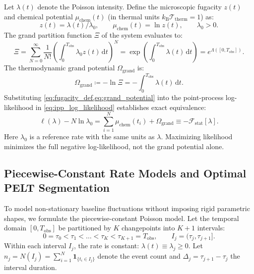 \begin{proposition}
  \label{prop:grand_canonical}
  Let $\lambda(t)$ denote the Poisson intensity. Define the
  microscopic fugacity $z(t)$ and chemical potential
  $\mu_{\mathrm{chem}}(t)$ (in thermal units
  $k_{\mathrm{B}}\mathcal{T}_{\mathrm{therm}} = 1$) as:
  \begin{equation}
    z(t)=\lambda(t)/\lambda_0,\qquad
    \mu_{\mathrm{chem}}(t)=\ln z(t),\qquad\lambda_0>0.
    \label{eq:fugacity_def}
  \end{equation}
  The grand partition function $\Xi$ of the system evaluates to:
  \begin{equation}
    \Xi = \sum_{N=0}^\infty \frac{1}{N!} \left(
    \int_0^{T_{\mathrm{obs}}} \lambda_0z(t) \, \mathrm{d}t \right)^N =
    \exp\left( \int_0^{T_{\mathrm{obs}}} \lambda(t) \, \mathrm{d}t
    \right) = e^{\Lambda([0, T_{\mathrm{obs}}])}.
    \label{eq:grand_partition_function}
  \end{equation}
  The thermodynamic grand potential $\Omega_{\mathrm{grand}}$ is:
  \begin{equation}
    \Omega_{\mathrm{grand}} \coloneqq -\ln \Xi =
    -\int_0^{T_{\mathrm{obs}}} \lambda(t) \, \mathrm{d}t.
    \label{eq:grand_potential}
  \end{equation}
  Substituting \cref{eq:fugacity_def,eq:grand_potential} into the point-process
  log-likelihood in \cref{eq:ipp_log_likelihood} establishes exact equivalence:
  \begin{equation}
    \ell(\lambda)-N\ln\lambda_0 = \sum_{i=1}^N \mu_{\mathrm{chem}}(t_i) +
    \Omega_{\mathrm{grand}} \equiv -\mathcal{F}_{\mathrm{stat}}[\lambda].
    \label{eq:stat_mech_likelihood_equiv}
  \end{equation}
  Here $\lambda_0$ is a reference rate with the same units as $\lambda$.
  Maximizing likelihood minimizes the full negative log-likelihood,
  not the grand potential alone.
\end{proposition}

\subsection{Piecewise-Constant Rate Models and Optimal PELT Segmentation}
\label{subsec:pelt_segmentation}

To model non-stationary baseline fluctuations without imposing rigid
parametric shapes, we formulate the piecewise-constant Poisson
model. Let the temporal domain $[0, T_{\mathrm{obs}}]$ be
partitioned by $K$ changepoints into $K+1$ intervals:
\begin{equation}
  0 = \tau_0 < \tau_1 < \dots < \tau_K < \tau_{K+1} =
  T_{\mathrm{obs}}, \qquad I_j = (\tau_j, \tau_{j+1}].
  \label{eq:changepoint_partition}
\end{equation}
Within each interval $I_j$, the rate is constant: $\lambda(t) \equiv
\lambda_j \ge 0$. Let $n_j = N(I_j) = \sum_{i=1}^N \mathbf{1}_{\{t_i
\in I_j\}}$ denote the event count and $\Delta_j = \tau_{j+1} -
\tau_j$ the interval duration.

